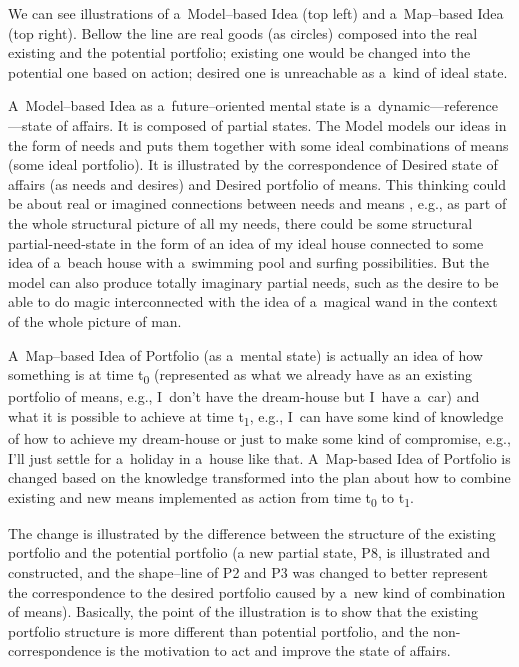 We can see illustrations of a~Model–based Idea (top left) and a~Map–based Idea (top right). Bellow the line are real goods (as circles) composed into the real existing and the potential portfolio; existing one would be changed into the potential one based on action; desired one is unreachable as a~kind of ideal state.



A~Model–based Idea as a~future–oriented mental state is a~dynamic---reference---state of affairs. It is composed of partial states. The Model models our ideas in the form of needs and puts them together with some ideal combinations of means (some ideal portfolio). It is illustrated by the correspondence of Desired state of affairs (as needs and desires) and Desired portfolio of means. This thinking could be about real or imagined connections between needs and means 
\parencite[][]{}, %
 e.g., as part of the whole structural picture of all my needs, there could be some structural partial-need-state in the form of an idea of my ideal house connected to some idea of a~beach house with a~swimming pool and surfing possibilities. But the model can also produce totally imaginary partial needs, such as the desire to be able to do magic interconnected with the idea of a~magical wand in the context of the whole picture of man.



A~Map–based Idea of Portfolio (as a~mental state) is actually an idea of how something is at time t\textsubscript{0} (represented as what we already have as an existing portfolio of means, e.g., I~don't have the dream-house but I~have a~car) and what it is possible to achieve at time t\textsubscript{1}, e.g., I~can have some kind of knowledge of how to achieve my dream-house or just to make some kind of compromise, e.g., I'll just settle for a~holiday in a~house like that. A~Map-based Idea of Portfolio is changed based on the knowledge transformed into the plan about how to combine existing and new means implemented as action from time t\textsubscript{0} to t\textsubscript{1}.



The change is illustrated by the difference between the structure of the existing portfolio and the potential portfolio (a new partial state, P8, is illustrated and constructed, and the shape–line of P2 and P3 was changed to better represent the correspondence to the desired portfolio caused by a~new kind of combination of means). Basically, the point of the illustration is to show that the existing portfolio structure is more different than potential portfolio, and the non-correspondence is the motivation to act and improve the state of affairs.




